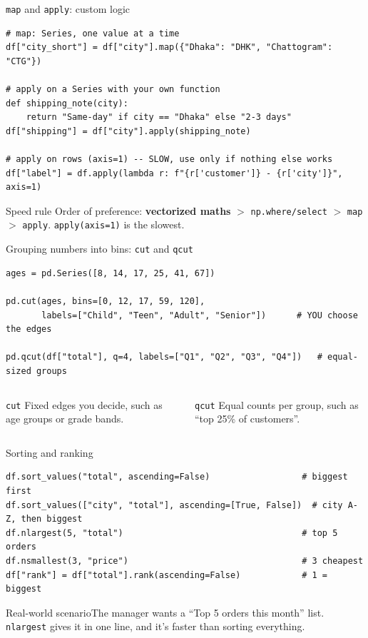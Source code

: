 \documentclass[aspectratio=169,10pt]{beamer}
\newcommand{\code}[1]{\texttt{#1}}
\newcommand{\scenario}[1]{\begin{exampleblock}{Real-world scenario}#1\end{exampleblock}}
\begin{document}
\begin{frame}[fragile]{\texttt{map} and \texttt{apply}: custom logic}
\begin{lstlisting}
# map: Series, one value at a time
df["city_short"] = df["city"].map({"Dhaka": "DHK", "Chattogram": "CTG"})

# apply on a Series with your own function
def shipping_note(city):
    return "Same-day" if city == "Dhaka" else "2-3 days"
df["shipping"] = df["city"].apply(shipping_note)

# apply on rows (axis=1) -- SLOW, use only if nothing else works
df["label"] = df.apply(lambda r: f"{r['customer']} - {r['city']}", axis=1)
\end{lstlisting}
  \begin{alertblock}{Speed rule}
    Order of preference: \textbf{vectorized maths} $>$ \code{np.where/select} $>$
    \code{map} $>$ \code{apply}. \code{apply(axis=1)} is the slowest.
  \end{alertblock}
\end{frame}

\begin{frame}[fragile]{Grouping numbers into bins: \texttt{cut} and \texttt{qcut}}
\begin{lstlisting}
ages = pd.Series([8, 14, 17, 25, 41, 67])

pd.cut(ages, bins=[0, 12, 17, 59, 120],
       labels=["Child", "Teen", "Adult", "Senior"])      # YOU choose the edges

pd.qcut(df["total"], q=4, labels=["Q1", "Q2", "Q3", "Q4"])   # equal-sized groups
\end{lstlisting}
  \begin{columns}[T]
    \begin{block}{\code{cut}}
      Fixed edges you decide, such as age groups or grade bands.
    \end{block}
    \begin{block}{\code{qcut}}
      Equal counts per group, such as ``top 25\% of customers''.
    \end{block}
  \end{columns}
\end{frame}

\begin{frame}[fragile]{Sorting and ranking}
\begin{lstlisting}
df.sort_values("total", ascending=False)                  # biggest first
df.sort_values(["city", "total"], ascending=[True, False])  # city A-Z, then biggest
df.nlargest(5, "total")                                   # top 5 orders
df.nsmallest(3, "price")                                  # 3 cheapest
df["rank"] = df["total"].rank(ascending=False)            # 1 = biggest
\end{lstlisting}
  \scenario{The manager wants a ``Top 5 orders this month'' list. \code{nlargest} gives it
  in one line, and it's faster than sorting everything.}
\end{frame}
\end{document}
